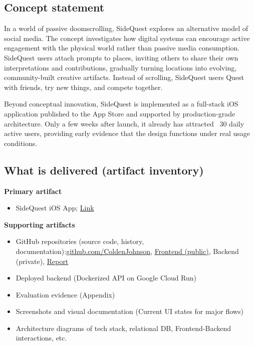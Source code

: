 \documentclass[12pt]{article}
\begin{document}
\subsection{Concept statement}


In a world of passive doomscrolling, SideQuest explores an alternative model of social media. The concept investigates how digital systems can encourage active engagement with the physical world rather than passive media consumption. SideQuest users attach prompts to places, inviting others to share their own interpretations and contributions, gradually turning locations into evolving, community-built creative artifacts. Instead of scrolling, SideQuest users Quest with friends, try new things, and compete together.

Beyond conceptual innovation, SideQuest is implemented as a full-stack iOS application published to the App Store and supported by production-grade architecture. Only a few weeks after launch, it already has attracted ~30 daily active users, providing early evidence that the design functions under real usage conditions.

\subsection{What is delivered (artifact inventory)}

\textbf{Primary artifact}
\begin{itemize}[leftmargin=*, itemsep=0.25\baselineskip]
  \item SideQuest iOS App; \href{https://apps.apple.com/us/app/sidequest-explore-challenge/id6753264647}{Link}
\end{itemize}

\textbf{Supporting artifacts}
\begin{itemize}[leftmargin=*, itemsep=0.25\baselineskip]
  \item GitHub repositories (source code, history, documentation):\href{https://github.com/ColdenJohnson}{github.com/ColdenJohnson}, \href{https://github.com/ColdenJohnson/geoapp}{Frontend (public)}, Backend (private), \href{https://github.com/ColdenJohnson/SignatureWorkReport_SideQuest/tree/main}{Report}
  \item Deployed backend (Dockerized API on Google Cloud Run)
  \item Evaluation evidence (Appendix)
  \item Screenshots and visual documentation (Current UI states for major flows)
  \item Architecture diagrams of tech stack, relational DB, Frontend-Backend interactions, etc.
\end{itemize}
\end{document}
